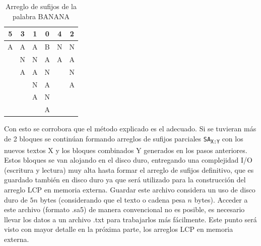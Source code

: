 \begin{table}[!hbt]
\centering
\begin{tabular}{cccccc}
\hline
\multicolumn{1}{|c|}{5} & \multicolumn{1}{c|}{3} & \multicolumn{1}{c|}{1} & \multicolumn{1}{c|}{0} & \multicolumn{1}{c|}{4} & \multicolumn{1}{c|}{2} \\ \hline
A                       & A                      & A                      & B                      & N                      & N                      \\
                        & N                      & N                      & A                      & A                      & A                      \\
                        & A                      & A                      & N                      &                        & N                      \\
                        &                        & N                      & A                      &                        & A                      \\
                        &                        & A                      & N                      &                        &                        \\
                        &                        &                        & A                      &                        &                       
\end{tabular}
\caption{Arreglo de sufijos de la palabra BANANA}
\end{table}

Con esto se corrobora que el método explicado es el adecuado. Si se tuvieran más de 2 bloques se continúan formando arreglos de sufijos parciales \texttt{SA\textsubscript{X:Y}} con los nuevos textos X y los bloques combinados Y generados en los pasos anteriores. Estos bloques se van alojando en el disco duro, entregando una complejidad I/O (escritura y lectura) muy alta hasta formar el arreglo de sufijos definitivo, que es guardado también en disco duro ya que será utilizado para la construcción del arreglo LCP en memoria externa. Guardar este archivo considera un uso de disco duro de $5n$ bytes (considerando que el texto o cadena pesa $n$ bytes). Acceder a este archivo (formato .sa5) de manera convencional no es posible, es necesario llevar los datos a un archivo .txt para trabajarlos más fácilmente. Este punto será visto con mayor detalle en la próxima parte, los arreglos LCP en memoria externa. 

